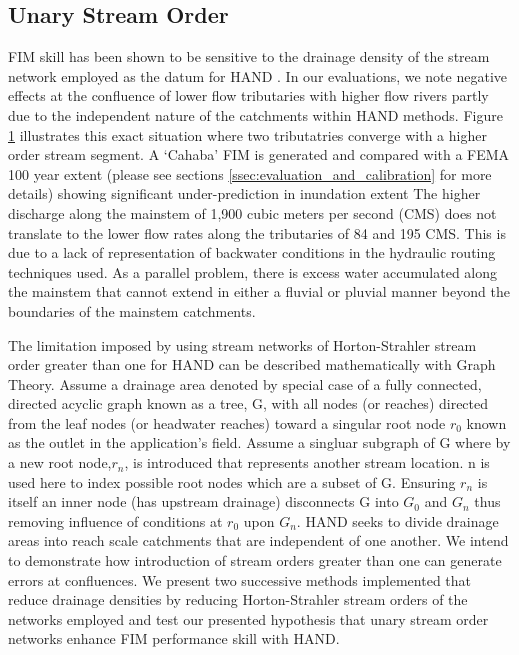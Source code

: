 \subsection{Unary Stream Order}
\label{ssec:unary_stream_order}
%
FIM skill has been shown to be sensitive to the drainage density of the stream network employed as the datum for HAND \cite{zhang2018comparative,mcgehee2016modified,li2020evaluation,nobre2016hand}.
In our evaluations, we note negative effects at the confluence of lower flow tributaries with higher flow rivers partly due to the independent nature of the catchments within HAND methods.
Figure \ref{fig:confluence_problem_statement} illustrates this exact situation where two tributatries converge with a higher order stream segment. 
A `Cahaba' FIM is generated and compared with a FEMA 100 year extent (please see sections \ref{ssec:evaluation_and_calibration} for more details) showing significant under-prediction in inundation extent
The higher discharge along the mainstem of 1,900 cubic meters per second (CMS) does not translate to the lower flow rates along the tributaries of 84 and 195 CMS. 
This is due to a lack of representation of backwater conditions in the hydraulic routing techniques used.
As a parallel problem, there is excess water accumulated along the mainstem that cannot extend in either a fluvial or pluvial manner beyond the boundaries of the mainstem catchments.

\begin{figure}[h!]
\centering
\caption{}
\label{fig:confluence_problem_statement}
\end{figure}
%
The limitation imposed by using stream networks of Horton-Strahler stream order \cite{horton1945erosional,strahler1952hypsometric,strahler1952hypsometric} greater than one for HAND can be described mathematically with Graph Theory.
Assume a drainage area denoted by special case of a fully connected, directed acyclic graph known as a tree, G, with all nodes (or reaches) directed from the leaf nodes (or headwater reaches) toward a singular root node $r_0$ known as the outlet in the application's field.
Assume a singluar subgraph of G where by a new root node,$r_n$, is introduced that represents another stream location.
n is used here to index possible root nodes which are a subset of G.
Ensuring $r_n$ is itself an inner node (has upstream drainage) disconnects G into $G_0$ and $G_n$ thus removing influence of conditions at $r_0$ upon $G_n$.
HAND seeks to divide drainage areas into reach scale catchments that are independent of one another.
We intend to demonstrate how introduction of stream orders greater than one can generate errors at confluences.
We present two successive methods implemented that reduce drainage densities by reducing Horton-Strahler stream orders of the networks employed and test our presented hypothesis that unary stream order networks enhance FIM performance skill with HAND.
%
